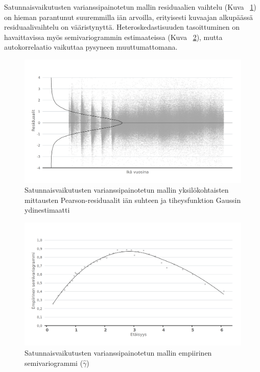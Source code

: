 \documentclass[finnish]{docopts}
\begin{document}
Satunnaisvaikutusten varianssipainotetun mallin residuaalien vaihtelu (Kuva ~\ref{fig:lme2_ika_v_resid}) on hieman parantunut suuremmilla iän arvoilla, erityisesti kuvaajan alkupäässä residuaalivaihtelu on vääristynyttä. Heteroskedastisuuden tasoittuminen on havaittavissa myös semivariogrammin estimaateissa (Kuva ~\ref{fig:lme2_v_vario}), mutta autokorrelaatio vaikuttaa pysyneen muuttumattomana.\\

\begin{figure}[H]
\centering
  \includegraphics[scale=0.8]{kuvaajat/lme2_ika_v_residuaalit.png}
  \caption{Satunnaisvaikutusten varianssipainotetun mallin yksilökohtaisten mittausten Pearson-residuaalit iän suhteen ja tiheysfunktion Gaussin ydinestimaatti}
  \label{fig:lme2_ika_v_resid}
\end{figure}

\begin{figure}[H]
\centering
  \includegraphics[scale=0.8]{kuvaajat/lme2_v_vario.png}
  \caption{Satunnaisvaikutusten varianssipainotetun mallin empiirinen semivariogrammi ($\hat{\gamma}$)}
  \label{fig:lme2_v_vario}
\end{figure}
\end{document}

